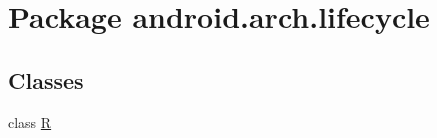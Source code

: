 \hypertarget{namespaceandroid_1_1arch_1_1lifecycle}{}\section{Package android.\+arch.\+lifecycle}
\label{namespaceandroid_1_1arch_1_1lifecycle}
\subsection*{Classes}
\begin{DoxyCompactItemize}
\item 
class \mbox{\hyperlink{classandroid_1_1arch_1_1lifecycle_1_1R}{R}}
\end{DoxyCompactItemize}
